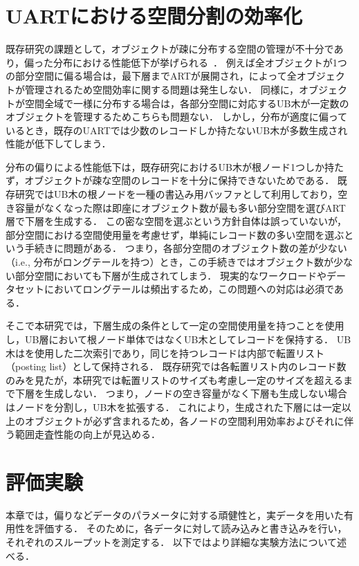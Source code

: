\chapter{UARTにおける空間分割の効率化}

既存研究の課題として，オブジェクトが疎に分布する空間の管理が不十分であり，偏った分布における性能低下が挙げられる~\cite{deim:Suzuki2023}．
例えば全オブジェクトが1つの部分空間に偏る場合は，最下層までARTが展開され，\BTree によって全オブジェクトが管理されるため空間効率に関する問題は発生しない．
同様に，オブジェクトが空間全域で一様に分布する場合は，各部分空間に対応するUB木が一定数のオブジェクトを管理するためこちらも問題ない．
しかし，分布が適度に偏っているとき，既存のUARTでは少数のレコードしか持たないUB木が多数生成され性能が低下してしまう．

分布の偏りによる性能低下は，既存研究におけるUB木が根ノード1つしか持たず，オブジェクトが疎な空間のレコードを十分に保持できないためである．
既存研究ではUB木の根ノードを一種の書込み用バッファとして利用しており，空き容量がなくなった際は即座にオブジェクト数が最も多い部分空間を選びART層で下層を生成する．
この密な空間を選ぶという方針自体は誤っていないが，部分空間における空間使用量を考慮せず，単純にレコード数の多い空間を選ぶという手続きに問題がある．
つまり，各部分空間のオブジェクト数の差が少ない（i.e., 分布がロングテールを持つ）とき，この手続きではオブジェクト数が少ない部分空間においても下層が生成されてしまう．
現実的なワークロードやデータセットにおいてロングテールは頻出するため，この問題への対応は必須である．

そこで本研究では，下層生成の条件として一定の空間使用量を持つことを使用し，UB層において根ノード単体ではなくUB木としてレコードを保持する．
UB木は\ZValue を使用した二次索引であり，同じ\ZValue を持つレコードは内部で転置リスト（posting list）として保持される．
既存研究では各転置リスト内のレコード数のみを見たが，本研究では転置リストのサイズも考慮し一定のサイズを超えるまで下層を生成しない．
つまり，ノードの空き容量がなく下層も生成しない場合はノードを分割し，UB木を拡張する．
これにより，生成された下層には一定以上のオブジェクトが必ず含まれるため，各ノードの空間利用効率およびそれに伴う範囲走査性能の向上が見込める．





\chapter{評価実験}

本章では，偏りなどデータのパラメータに対する頑健性と，実データを用いた有用性を評価する．
そのために，各データに対して読み込みと書き込みを行い，それぞれのスループットを測定する．
以下ではより詳細な実験方法について述べる．

